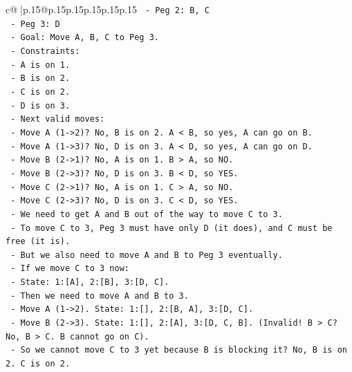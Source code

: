 \documentclass{article}
\begin{document}
{\begin{supertabular}{c@{$\;$}|p{.15\linewidth}@{}p{.15\linewidth}p{.15\linewidth}p{.15\linewidth}p{.15\linewidth}p{.15\linewidth}}
{{{\texttt{               {-} Peg 2: B, C} \\
\texttt{               {-} Peg 3: D} \\
\texttt{             {-} Goal: Move A, B, C to Peg 3.} \\
\texttt{             {-} Constraints:} \\
\texttt{               {-} A is on 1.} \\
\texttt{               {-} B is on 2.} \\
\texttt{               {-} C is on 2.} \\
\texttt{               {-} D is on 3.} \\
\texttt{             {-} Next valid moves:} \\
\texttt{               {-} Move A (1{-}>2)? No, B is on 2. A < B, so yes, A can go on B.} \\
\texttt{               {-} Move A (1{-}>3)? No, D is on 3. A < D, so yes, A can go on D.} \\
\texttt{               {-} Move B (2{-}>1)? No, A is on 1. B > A, so NO.} \\
\texttt{               {-} Move B (2{-}>3)? No, D is on 3. B < D, so YES.} \\
\texttt{               {-} Move C (2{-}>1)? No, A is on 1. C > A, so NO.} \\
\texttt{               {-} Move C (2{-}>3)? No, D is on 3. C < D, so YES.} \\
\texttt{             {-} We need to get A and B out of the way to move C to 3.} \\
\texttt{             {-} To move C to 3, Peg 3 must have only D (it does), and C must be free (it is).} \\
\texttt{             {-} But we also need to move A and B to Peg 3 eventually.} \\
\texttt{             {-} If we move C to 3 now:} \\
\texttt{               {-} State: 1:{[}A{]}, 2:{[}B{]}, 3:{[}D, C{]}.} \\
\texttt{               {-} Then we need to move A and B to 3.} \\
\texttt{               {-} Move A (1{-}>2). State: 1:{[}{]}, 2:{[}B, A{]}, 3:{[}D, C{]}.} \\
\texttt{               {-} Move B (2{-}>3). State: 1:{[}{]}, 2:{[}A{]}, 3:{[}D, C, B{]}. (Invalid! B > C? No, B > C. B cannot go on C).} \\
\texttt{               {-} So we cannot move C to 3 yet because B is blocking it? No, B is on 2. C is on 2.} \\
}}}
\end{supertabular}}
\end{document}
